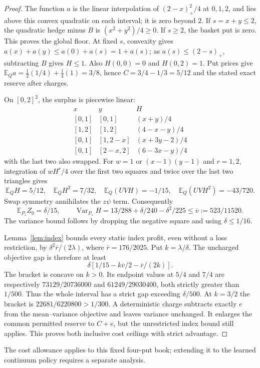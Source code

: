 \documentclass[11pt,a4paper]{amsart}
\theoremstyle{plain}
\theoremstyle{definition}
\theoremstyle{remark}
\DeclareMathOperator{\Var}{Var}
\newcommand{\EE}{\mathbb{E}}
\begin{document}
\begin{proof}
The function $a$ is the linear interpolation of $(2-x)_+^2/4$ at $0,1,2$, and lies above this convex quadratic on each interval; it is zero beyond $2$. If $s=x+y\le2$, the quadratic hedge minus $B$ is $(x^2+y^2)/4\ge0$. If $s\ge2$, the basket put is zero. This proves the global floor. At fixed $s$, convexity gives
$a(x)+a(y)\le a(0)+a(s)=1+a(s)$; as $a(s)\le(2-s)_+$, subtracting $B$ gives $H\le1$. Also $H(0,0)=0$ and $H(0,2)=1$. Put prices give $\EE_Q a=\frac12(1/4)+\frac14(1)=3/8$, hence $C=3/4-1/3=5/12$ and the stated exact reserve after charges.

On $[0,2]^2$, the surplus is piecewise linear:
\[
\begin{array}{c|c|c}
 x&y&H\\ \hline
 [0,1]&[0,1]&(x+y)/4\\
 {[1,2]}&[1,2]&(4-x-y)/4\\
 {[0,1]}&[1,2-x]&(x+3y-2)/4\\
 {[0,1]}&[2-x,2]&(6-3x-y)/4
\end{array}
\]
with the last two also swapped. For $w=1$ or $(x-1)(y-1)$ and $r=1,2$, integration of $wH^r/4$ over the first two squares and twice over the last two triangles gives
\begin{equation}\label{eq:fixedmoments}
 \EE_QH=5/12,\quad \EE_QH^2=7/32,\quad
 \EE_Q(UVH)=-1/15,\quad \EE_Q(UVH^2)=-43/720.
\end{equation}
Swap symmetry annihilates the $z\psi$ term. Consequently
\[
 \EE_{P_z}Z_0=\delta/15,\qquad
 \Var_{P_z}H=13/288+\delta/240-\delta^2/225
 \le\overline v:=523/11520.
\]
The variance bound follows by dropping the negative square and using $\delta\le1/16$.

Lemma~\ref{lem:index} bounds every static index profit, even without a loss restriction, by $\delta^2\overline r/(2\lambda)$, where $\overline r=176/2025$. Put $k=\lambda/\delta$. The uncharged objective gap is therefore at least
\[
 \delta\left[1/15-k\overline v/2-\overline r/(2k)\right].
\]
The bracket is concave on $k>0$. Its endpoint values at $5/4$ and $7/4$ are respectively
$73129/20736000$ and $61249/29030400$, both strictly greater than $1/500$. Thus the whole interval has a strict gap exceeding $\delta/500$. At $k=3/2$ the bracket is $22681/6220800>1/300$. A deterministic charge subtracts exactly $e$ from the mean--variance objective and leaves variance unchanged. It enlarges the common permitted reserve to $C+e$, but the unrestricted index bound still applies. This proves both inclusive cost ceilings with strict advantage.
\end{proof}
The cost allowance applies to this fixed four-put book; extending it to the learned continuum policy requires a separate analysis.
\end{document}
